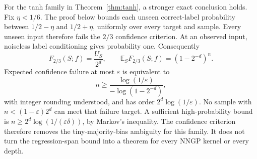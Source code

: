 \documentclass[11pt]{article}
\theoremstyle{remark}\newtheorem{remark}[theorem]{Remark}
\begin{document}
For the tanh family in Theorem~\ref{thm:tanh}, a stronger exact conclusion
holds. Fix $\eta<1/6$. The proof below bounds each unseen correct-label
probability between $1/2-\eta$ and $1/2+\eta$, uniformly over every target and
sample. Every unseen input therefore fails the $2/3$ confidence criterion.
At an observed input, noiseless label conditioning gives probability one.
Consequently
\[
 F_{2/3}(S;f)=\frac{U_S}{2^d},\qquad
 \mathbb E_S F_{2/3}(S;f)=(1-2^{-d})^n.
\]
Expected confidence failure at most $\varepsilon$ is equivalent to
\[
 n\geq\frac{\log(1/\varepsilon)}{-\log(1-2^{-d})},
\]
with integer rounding understood, and has order
$2^d\log(1/\varepsilon)$. No sample with $n<(1-\varepsilon)2^d$ can
meet that failure target. A sufficient high-probability bound is
$n\geq2^d\log(1/(\varepsilon\delta))$, by Markov's inequality.
The confidence criterion therefore removes the tiny-majority-bias ambiguity
for this family. It does not turn the regression-span bound into a theorem
for every NNGP kernel or every depth.
\end{document}

